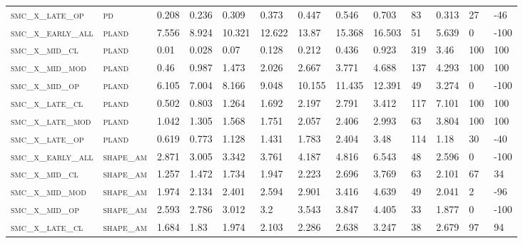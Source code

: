 \begin{landscape}
\begin{center}
\begin{footnotesize}
\begin{longtable}{lllllllllllll}
\textsc{smc\_x\_late\_op  } & \textsc{pd        }   & 0.208    & 0.236    & 0.309    & 0.373    & 0.447    & 0.546    & 0.703    & 83  & 0.313    & 27  & -46    \\
\textsc{smc\_x\_early\_all} & \textsc{pland     }   & 7.556    & 8.924    & 10.321   & 12.622   & 13.87    & 15.368   & 16.503   & 51  & 5.639    & 0   & -100   \\
\textsc{smc\_x\_mid\_cl   } & \textsc{pland     }   & 0.01     & 0.028    & 0.07     & 0.128    & 0.212    & 0.436    & 0.923    & 319 & 3.46     & 100 & 100    \\
\textsc{smc\_x\_mid\_mod  } & \textsc{pland     }   & 0.46     & 0.987    & 1.473    & 2.026    & 2.667    & 3.771    & 4.688    & 137 & 4.293    & 100 & 100    \\
\textsc{smc\_x\_mid\_op   } & \textsc{pland     }   & 6.105    & 7.004    & 8.166    & 9.048    & 10.155   & 11.435   & 12.391   & 49  & 3.274    & 0   & -100   \\
\textsc{smc\_x\_late\_cl  } & \textsc{pland     }   & 0.502    & 0.803    & 1.264    & 1.692    & 2.197    & 2.791    & 3.412    & 117 & 7.101    & 100 & 100    \\
\textsc{smc\_x\_late\_mod } & \textsc{pland     }   & 1.042    & 1.305    & 1.568    & 1.751    & 2.057    & 2.406    & 2.993    & 63  & 3.804    & 100 & 100    \\
\textsc{smc\_x\_late\_op  } & \textsc{pland     }   & 0.619    & 0.773    & 1.128    & 1.431    & 1.783    & 2.404    & 3.48     & 114 & 1.18     & 30  & -40    \\
\textsc{smc\_x\_early\_all} & \textsc{shape\_am }   & 2.871    & 3.005    & 3.342    & 3.761    & 4.187    & 4.816    & 6.543    & 48  & 2.596    & 0   & -100   \\
\textsc{smc\_x\_mid\_cl   } & \textsc{shape\_am }   & 1.257    & 1.472    & 1.734    & 1.947    & 2.223    & 2.696    & 3.769    & 63  & 2.101    & 67  & 34     \\
\textsc{smc\_x\_mid\_mod  } & \textsc{shape\_am }   & 1.974    & 2.134    & 2.401    & 2.594    & 2.901    & 3.416    & 4.639    & 49  & 2.041    & 2   & -96    \\
\textsc{smc\_x\_mid\_op   } & \textsc{shape\_am }   & 2.593    & 2.786    & 3.012    & 3.2      & 3.543    & 3.847    & 4.405    & 33  & 1.877    & 0   & -100   \\
\textsc{smc\_x\_late\_cl  } & \textsc{shape\_am }   & 1.684    & 1.83     & 1.974    & 2.103    & 2.286    & 2.638    & 3.247    & 38  & 2.679    & 97  & 94     \\

\end{longtable}
\end{footnotesize}
\end{center}
\end{landscape}
